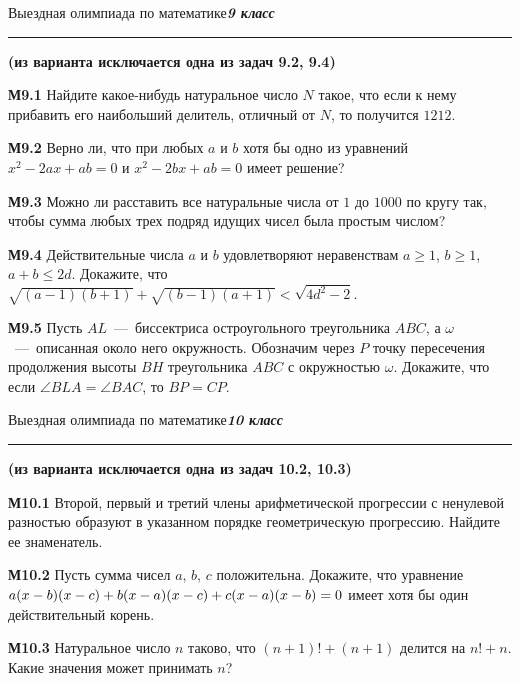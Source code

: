 \documentclass[12pt, a4paper, usenames]{article}
\newcommand*{\hm}[1]{#1\nobreak\discretionary{}%
{\hbox{$\mathsurround=0pt #1$}}{}}
\begin{document}
\bigskip
\newpage
\begin{center}
Выездная олимпиада по математике\hfill\textit{\bf 9 класс}
\hrule\medskip
{\bf (из варианта исключается одна из задач 9.2, 9.4)}
\end{center}

{\bf М9.1} Найдите какое-нибудь натуральное число $N$ такое, что если к нему прибавить его наибольший делитель, отличный от $N$, то получится $1212$.

\bigskip

{\bf М9.2} Верно ли, что при любых $a$ и $b$ хотя бы одно из уравнений $x^2 - 2ax + ab = 0$ и $x^2 - 2bx + ab = 0$ имеет решение?

\bigskip

{\bf М9.3} Можно ли расставить все натуральные числа от $1$ до $1000$ по кругу так, чтобы сумма любых трех подряд идущих чисел была простым числом?

\bigskip

{\bf М9.4} Действительные числа $a$ и $b$ удовлетворяют неравенствам $a \geq 1$, $b \geq 1$, $a+b \leq 2d$. Докажите, что $\sqrt{(a-1)(b+1)} + \sqrt{(b-1)(a+1)} < \sqrt{4d^2-2}$.

\bigskip

{\bf М9.5} Пусть $AL$~---~биссектриса остроугольного треугольника $ABC$, а $\omega$~---~описанная около него окружность. Обозначим через $P$ точку пересечения продолжения высоты $BH$ треугольника $ABC$ с окружностью $\omega$. Докажите, что если $\angle BLA = \angle BAC$, то $BP = CP$. 

\bigskip

\newpage
\begin{center}
Выездная олимпиада по математике\hfill\textit{\bf 10 класс}
\hrule\medskip
{\bf (из варианта исключается одна из задач 10.2, 10.3)}
\end{center}

{\bf М10.1} Второй, первый и третий члены арифметической прогрессии с ненулевой разностью образуют в указанном порядке геометрическую прогрессию. Найдите ее знаменатель.

\bigskip

{\bf М10.2} Пусть сумма чисел $a$, $b$, $c$ положительна. Докажите, что уравнение $a(x-b)(x-c) + b(x\hm-a)(x-c) + c(x-a)(x-b) = 0$ имеет хотя бы один действительный корень.

\bigskip

{\bf М10.3} Натуральное число $n$ таково, что $(n+1)!+(n+1)$ делится на $n! + n$. Какие значения может принимать $n$?
\end{document}

